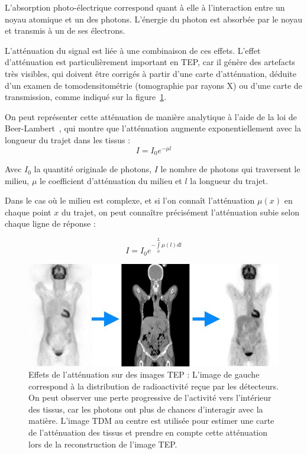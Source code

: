 L'absorption photo-électrique correspond quant à elle à l'interaction entre un noyau atomique et un des photons. L'énergie du photon est absorbée par le noyau et transmis à un de ses électrons. 

L'atténuation du signal est liée à une combinaison de ces effets. L'effet d'atténuation est particulièrement important en TEP, car il génère des artefacts très visibles, qui doivent être corrigés à partir d'une carte d'atténuation, déduite d'un examen de tomodensitométrie (tomographie par rayons X) ou d'une carte de transmission, comme indiqué sur la figure~\ref{fig:schemaAtt}.


On peut représenter cette atténuation de manière analytique à l'aide de la loi de Beer-Lambert~\cite{cherry2006pet}, qui montre que l'atténuation augmente exponentiellement avec la longueur du trajet dans les tissus :
\begin{equation}
I = I_0 e^{-\mu l}
\end{equation}

Avec $I_0$ la quantité originale de photons, $I$ le nombre de photons qui traversent le milieu, $\mu$ le coefficient d'atténuation du milieu et $l$ la longueur du trajet. 

Dans le cas où le milieu est complexe, et si l'on connaît l'atténuation $\mu(x)$ en chaque point $x$ du trajet, on peut connaître précisément l'atténuation subie selon chaque ligne de réponse  :

\begin{equation}
I = I_0 e^{- \int\limits^L_0 \mu(l) dl}
\end{equation}


\begin{figure}
\centering
\includegraphics[width=12cm]{images/attenuationNonAtt}
\caption[Effet de l'atténuation sur les images TEP]{Effets de l'atténuation sur des images TEP : L'image de gauche correspond à la distribution de radioactivité reçue par les détecteurs. On peut observer une perte progressive de l'activité vers l'intérieur des tissus, car les photons ont plus de chances d'interagir avec la matière. L'image TDM au centre est utilisée pour estimer une carte de l'atténuation des tissus et prendre en compte cette atténuation lors de la reconstruction de l'image TEP.}
\label{fig:schemaAtt}
\end{figure}

